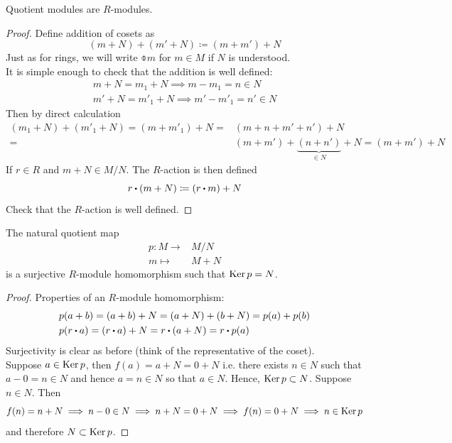 \documentclass[../Main.tex]{subfiles}
\begin{document}
\begin{prop}[title =Quotient Module is \texorpdfstring{$R$}{R}-module]
	Quotient modules are $R$-modules.
\end{prop}
\begin{proof}
	Define addition of cosets as 
	\[(m+N) + (m'+N) \coloneqq (m+m')+N\]
	Just as for rings, we will write $\obar{m}$ for $m\in M$ if $N$ is understood.\\
	It is simple enough to check that the addition is well defined:
	\begin{align*}
	m+N = m_1 + N \implies m-m_1=n \in N\\
	m'+N = m'_1 +N \implies m'-m'_1 = n' \in N
	\end{align*}
	Then by direct calculation
	\begin{align*}(m_1+N)+(m'_1+N) = (m+m'_1)+N =& (m+n+m'+n')+N\\ =& (m+m')+\underbrace{(n+n')}_{\in N} + N =(m+m')+N\end{align*}
	If $r\in R$ and $m+N \in M/N$. The $R$-action is then defined \[r\rdot (m+N) \coloneqq (r\rdot m)+N\] \Exr Check that the $R$-action is well defined.
\end{proof}
\begin{prop}[title = Canonical quotient map is surjective]
	The natural quotient map
	\begin{align*}
	p\colon M \to& M/N \\
	m\mapsto& M+N
	\end{align*}
	is a surjective $R$-module homomorphism such that $\operatorname{Ker} p= N$.
\end{prop}
\begin{proof}
	Properties of an $R$-module homomorphism:
	\begin{align*}
	&p(a+b)=(a+b)+N=(a+N)+(b+N)=p(a)+p(b)\\
	&p(r\rdot a)=(r\rdot a)+N = r\rdot (a+N) = r\rdot p(a)
	\end{align*}
	Surjectivity is clear as before (think of the representative of the coset).\\
	Suppose $a\in \operatorname{Ker} p$, then $f(a) = a+N = 0+N$ i.e. there exists $n\in N$ such that $a-0=n\in N$ and hence $a=n\in N$ so that $a\in N$. Hence, $\operatorname{Ker} p \subset N$.
	Suppose $n\in N$. Then
	\[f(n)=n+N \implies n-0\in N \implies n+N = 0+N \implies f(n) = 0+N \implies n\in \operatorname{Ker} p\]
	and therefore $N \subset \operatorname{Ker} p$. 
\end{proof}
\end{document}
